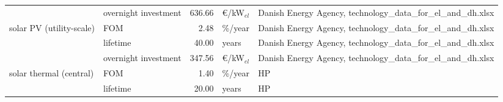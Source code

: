 \begin{longtable}{p{4cm}p{4cm}rp{3cm}p{10cm}}
                      & overnight investment &       636.66 &               \euro/kW$_{el}$ &                                                                                                                                                                                                                                                                        Danish Energy Agency, technology\_data\_for\_el\_and\_dh.xlsx \\
solar PV (utility-scale) & FOM &         2.48 &                       \%/year &                                                                                                                                                                                                                                                                        Danish Energy Agency, technology\_data\_for\_el\_and\_dh.xlsx \\
                      & lifetime &        40.00 &                         years &                                                                                                                                                                                                                                                                        Danish Energy Agency, technology\_data\_for\_el\_and\_dh.xlsx \\
                      & overnight investment &       347.56 &               \euro/kW$_{el}$ &                                                                                                                                                                                                                                                                        Danish Energy Agency, technology\_data\_for\_el\_and\_dh.xlsx \\
solar thermal (central) & FOM &         1.40 &                       \%/year &                                                                                                                                                                                                                                                                                                                                   HP \\
                      & lifetime &        20.00 &                         years &                                                                                                                                                                                                                                                                                                                                   HP \\

\end{longtable}

